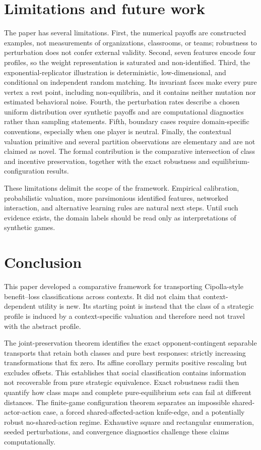 \documentclass[a4paper,fleqn]{cas-dc}
\theoremstyle{remark}
\begin{document}
\FloatBarrier
\section{Limitations and future work}
\label{sec:limitations}

The paper has several limitations. First, the numerical payoffs are constructed examples, not measurements of organizations, classrooms, or teams; robustness to perturbation does not confer external validity. Second, seven features encode four profiles, so the weight representation is saturated and non-identified. Third, the exponential-replicator illustration is deterministic, low-dimensional, and conditional on independent random matching. Its invariant faces make every pure vertex a rest point, including non-equilibria, and it contains neither mutation nor estimated behavioral noise. Fourth, the perturbation rates describe a chosen uniform distribution over synthetic payoffs and are computational diagnostics rather than sampling statements. Fifth, boundary cases require domain-specific conventions, especially when one player is neutral. Finally, the contextual valuation primitive and several partition observations are elementary and are not claimed as novel. The formal contribution is the comparative intersection of class and incentive preservation, together with the exact robustness and equilibrium-configuration results.

These limitations delimit the scope of the framework. Empirical calibration, probabilistic valuation, more parsimonious identified features, networked interaction, and alternative learning rules are natural next steps. Until such evidence exists, the domain labels should be read only as interpretations of synthetic games.

\section{Conclusion}
\label{sec:conclusion}

This paper developed a comparative framework for transporting Cipolla-style
benefit--loss classifications across contexts. It did not claim that
context-dependent utility is new. Its starting point is instead that the class
of a strategic profile is induced by a context-specific valuation and therefore
need not travel with the abstract profile.

The joint-preservation theorem identifies the exact
opponent-contingent separable transports that retain both classes and pure best
responses: strictly increasing transformations that fix zero. Its affine
corollary permits positive rescaling but excludes offsets. This establishes that social
classification contains information not recoverable from pure strategic
equivalence. Exact robustness radii then quantify how class maps and complete
pure-equilibrium sets can fail at different distances. The finite-game
configuration theorem separates an impossible shared-actor-action case, a
forced shared-affected-action knife-edge, and a potentially robust
no-shared-action regime. Exhaustive square and rectangular enumeration, seeded
perturbations, and convergence diagnostics challenge these claims
computationally.
\end{document}
